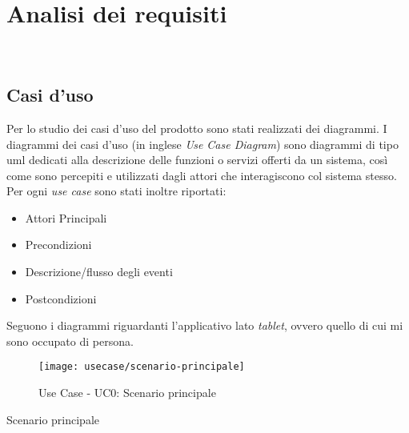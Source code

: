 
\chapter{Analisi dei requisiti}
\label{cap:analisi-requisiti}

\\

\section{Casi d'uso}

Per lo studio dei casi d'uso del prodotto sono stati realizzati dei diagrammi.
I diagrammi dei casi d'uso (in inglese \emph{Use Case Diagram}) sono diagrammi di tipo \gls{uml} dedicati alla descrizione delle funzioni o servizi offerti da un sistema, così come sono percepiti e utilizzati dagli attori che interagiscono col sistema stesso.
Per ogni \emph{use case} sono stati inoltre riportati:
\begin{itemize}
	\item Attori Principali
	\item Precondizioni
	\item Descrizione/flusso degli eventi
	\item Postcondizioni
\end{itemize}
Seguono i diagrammi riguardanti l'applicativo lato \emph{tablet}, ovvero quello di cui mi sono occupato di persona.

\begin{figure}[!h] 
    \centering 
    \texttt{[image: usecase/scenario-principale]} 
    \caption{Use Case - UC0: Scenario principale}
\end{figure}

\begin{usecase}{0}{Scenario principale}
\label{uc:scenario-principale}
\end{usecase}


